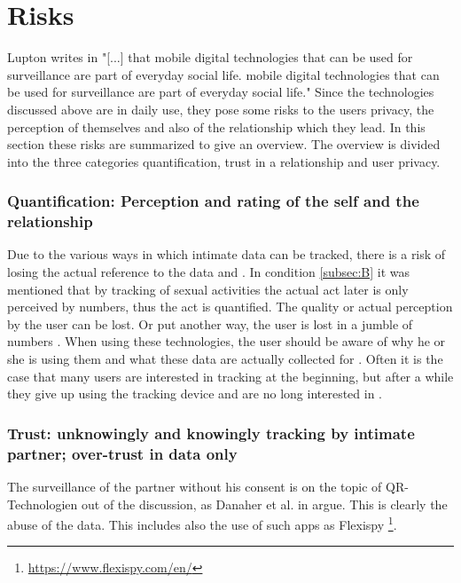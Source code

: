 \section{Risks}
\label{sec:risks}
Lupton writes in \cite{doi:10.1080/13691058.2014.920528} "[...] that mobile digital technologies that can be used for surveillance are part of everyday social life. mobile digital technologies that can be used for surveillance are part of everyday social life."
Since the technologies discussed above are in daily use, they pose some risks to the users privacy, the perception of themselves and also of the relationship which they lead.
In this section these risks are summarized to give an overview.
The overview is divided into the three categories quantification, trust in a relationship and user privacy.

\subsubsection{Quantification: Perception and rating of the self and the relationship}
Due to the various ways in which intimate data can be tracked, there is a risk of losing the actual reference to the data \cite{doi:10.1080/13691058.2014.920528} and \cite{lupton2016quantified}. In condition \ref{subsec:B} it was mentioned that by tracking of sexual activities the actual act later is only perceived by numbers, thus the act is quantified. The quality or actual perception by the user can be lost. Or put another way, the user is lost in a jumble of numbers \cite{kelly2017inevitable}.
When using these technologies, the user should be aware of why he or she is using them and what these data are actually collected for \cite{doi:10.1080/15265161.2017.1409823}. 
Often it is the case that many users are interested in tracking at the beginning, but after a while they give up using the tracking device and are no long interested in \cite{sjoklint2015complexities}.



\subsubsection{Trust: unknowingly and knowingly tracking by intimate partner; over-trust in data only}
The surveillance of the partner without his consent is on the topic of \acs{QR}-Technologien out of the discussion, as Danaher et al. in \cite{doi:10.1080/15265161.2017.1409823} argue. This is clearly the abuse of the data. This includes also the use of such apps as Flexispy \footnote{\url{https://www.flexispy.com/en/}}.

